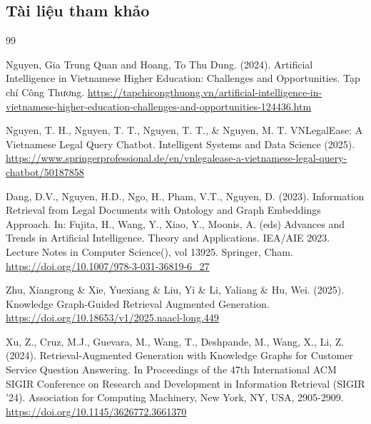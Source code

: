 \documentclass[a4paper,12pt]{article}
\begin{document}
\subsection*{Tài liệu tham khảo}
\vspace{-2em}
\renewcommand{\refname}{}
\begin{thebibliography}{99}

Nguyen, Gia Trung Quan and Hoang, To Thu Dung. (2024). Artificial Intelligence in Vietnamese Higher Education: Challenges and Opportunities. Tạp chí Công Thương. \url{https://tapchicongthuong.vn/artificial-intelligence-in-vietnamese-higher-education-challenges-and-opportunities-124436.htm}

Nguyen, T. H., Nguyen, T. T., Nguyen, T. T., \& Nguyen, M. T. VNLegalEase: A Vietnamese Legal Query Chatbot. Intelligent Systems and Data Science (2025). \url{https://www.springerprofessional.de/en/vnlegalease-a-vietnamese-legal-query-chatbot/50187858}




Dang, D.V., Nguyen, H.D., Ngo, H., Pham, V.T., Nguyen, D. (2023). Information Retrieval from Legal Documents with Ontology and Graph Embeddings Approach. In: Fujita, H., Wang, Y., Xiao, Y., Moonis, A. (eds) Advances and Trends in Artificial Intelligence. Theory and Applications. IEA/AIE 2023. Lecture Notes in Computer Science(), vol 13925. Springer, Cham. \url{https://doi.org/10.1007/978-3-031-36819-6_27}

Zhu, Xiangrong \& Xie, Yuexiang \& Liu, Yi \& Li, Yaliang \& Hu, Wei. (2025). Knowledge Graph-Guided Retrieval Augmented Generation. \url{https://doi.org/10.18653/v1/2025.naacl-long.449}

Xu, Z., Cruz, M.J., Guevara, M., Wang, T., Deshpande, M., Wang, X., Li, Z. (2024). Retrieval-Augmented Generation with Knowledge Graphs for Customer Service Question Answering. In Proceedings of the 47th International ACM SIGIR Conference on Research and Development in Information Retrieval (SIGIR '24). Association for Computing Machinery, New York, NY, USA, 2905-2909. \url{https://doi.org/10.1145/3626772.3661370}


\end{thebibliography}
\end{document}

